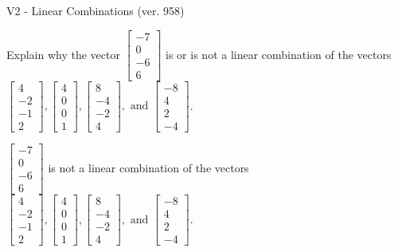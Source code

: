 \begin{exercise}
  \begin{exerciseTitle}V2 - Linear Combinations (ver. 958)\end{exerciseTitle}
  \begin{exerciseStatement}
    Explain why the vector \(\left[\begin{array}{c}
-7 \\
0 \\
-6 \\
6
\end{array}\right]\)  is or is not a linear 
	combination of the vectors \(\left[\begin{array}{c}
4 \\
-2 \\
-1 \\
2
\end{array}\right] , \left[\begin{array}{c}
4 \\
0 \\
0 \\
1
\end{array}\right] , \left[\begin{array}{c}
8 \\
-4 \\
-2 \\
4
\end{array}\right] , \text{ and } \left[\begin{array}{c}
-8 \\
4 \\
2 \\
-4
\end{array}\right]\).
	


  \end{exerciseStatement}
  \begin{exerciseAnswer}
   \(\left[\begin{array}{c}
-7 \\
0 \\
-6 \\
6
\end{array}\right]\) 
  	 is not  
	a linear combination of the vectors \(\left[\begin{array}{c}
4 \\
-2 \\
-1 \\
2
\end{array}\right] , \left[\begin{array}{c}
4 \\
0 \\
0 \\
1
\end{array}\right] , \left[\begin{array}{c}
8 \\
-4 \\
-2 \\
4
\end{array}\right] , \text{ and } \left[\begin{array}{c}
-8 \\
4 \\
2 \\
-4
\end{array}\right]\).


\end{exerciseAnswer}
\end{exercise}
